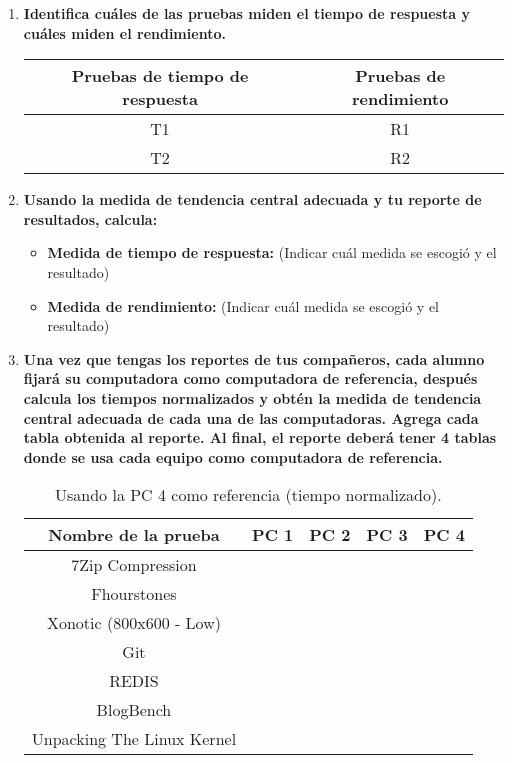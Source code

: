 \documentclass[12pt]{article}
\newcommand{\pl}[1]{\item \textbf{ #1 }}
\begin{document}
\begin{enumerate}[label=(\arabic{section}.\arabic{subsection}.\arabic{enumi})]
    \pl{Identifica cuáles de las pruebas miden el tiempo de respuesta y cuáles miden el rendimiento.}
    \begin{table}[htb]
        \centering
        \begin{tabular}{|c|c|}
        \hline
        Pruebas de tiempo de respuesta & Pruebas de rendimiento \\
        \hline
        T1 & R1 \\
        \hline
        T2 & R2 \\
        \hline
        \end{tabular}
    \end{table}\par

    \pl{Usando la medida de tendencia central adecuada y tu reporte de resultados, calcula:}
    \begin{itemize}
        \pl{Medida de tiempo de respuesta:}(Indicar cuál medida se escogió y el resultado)\par
    
        \pl{Medida de rendimiento:} (Indicar cuál medida se escogió y el resultado)\par
    \end{itemize}

    \pl{Una vez que tengas los reportes de tus compañeros, cada alumno fijará su computadora como computadora de referencia, después calcula los tiempos normalizados y obtén la medida de tendencia central adecuada de cada una de las computadoras. Agrega cada tabla obtenida al reporte. Al final, el reporte deberá tener 4 tablas donde se usa cada equipo como computadora de referencia.}

    \begin{table}[htb]
        \centering
        \begin{tabular}{|c|c|c|c|c|}
        \hline
        \textbf{Nombre de la prueba} & \textbf{PC 1} & \textbf{PC 2} & \textbf{PC 3} & \textbf{PC 4}\\
        \hline
        7Zip Compression & & & & \\
        \hline
        Fhourstones & & & & \\
        \hline
        Xonotic (800x600 - Low) & & & &  \\
        \hline
        Git & & & &  \\
        \hline
        REDIS & & & &  \\
        \hline
        BlogBench & & & &  \\
        \hline
        Unpacking The Linux Kernel & & & & \\
        \hline
        \end{tabular}
        \caption{Usando la PC 4 como referencia (tiempo normalizado).}
    \end{table}


\end{enumerate}
\end{document}
